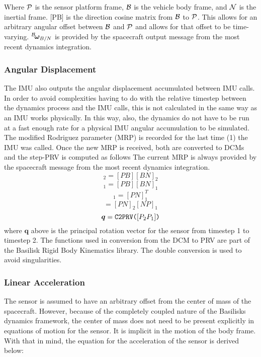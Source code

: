 Where $\cal{P}$ is the sensor platform frame, $\cal{B}$ is the vehicle body frame, and $\cal{N}$ is the inertial frame. [PB] is the direction cosine matrix from $\cal{B}$ to $\cal{P}$. This allows for an arbitrary angular offset between $\cal{B}$ and $\cal{P}$ and allows for that offset to be time-varying. $\leftexp{B}{\bm{\omega}_{B/N}}$ is provided by the spacecraft output message from the most recent dynamics integration.

\subsubsection{Angular Displacement}
The IMU also outputs the angular displacement accumulated between IMU calls. In order to avoid complexities having to do with the relative timestep between the dynamics process and the IMU calls, this is not calculated in the same way as an IMU works physically. In this way, also, the dynamics do not have to be run at a fast enough rate for a physical IMU angular accumulation to be simulated. 
The modified Rodriguez parameter (MRP) is recorded for the last time (1) the IMU was called. Once the new MRP is received, both are converted to DCMs and the step-PRV is computed as follows The current MRP is always provided by the spacecraft message from the most recent dynamics integration.
\begin{equation}
	[PN]_2 = [PB][BN]_2
\end{equation}
\begin{equation}
	[PN]_1 = [PB][BN]_1
\end{equation}
\begin{equation}
	[NP]_1 = [PN]_1^T
\end{equation}
\begin{equation}
	[P_2P_1] = [PN]_2[NP]_1
\end{equation}
\begin{equation}
\bm{q} = \verb|C2PRV(|[P_2P_1]\verb|)|
\end{equation}
where $\bm{q}$ above is the principal rotation vector for the sensor from timestep 1 to timestep 2. The functions used in conversion from the DCM to PRV are part of the Basilisk Rigid Body Kinematics library. The double conversion is used to avoid singularities.

\subsubsection{Linear Acceleration}
The sensor is assumed to have an arbitrary offset from the center of mass of the spacecraft. However, because of the completely coupled nature of the Basilisks dynamics framework, the center of mass does not need to be present explicitly in equations of motion for the sensor. It is implicit in the motion of the body frame. With that in mind, the equation for the acceleration of the sensor is derived below:

